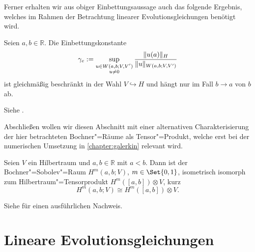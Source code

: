 \documentclass[../main.tex]{subfiles}
\begin{document}
Ferner erhalten wir aus obiger Einbettungsaussage auch das folgende Ergebnis, welches im Rahmen der Betrachtung linearer Evolutionsgleichungen benötigt wird.

\begin{Korollar}
\label{korollar:einbettungskonstante_M_e}
    Seien $a, b \in \mathbb{R}$.
    Die Einbettungskonstante
    \begin{equation}
        \label{eq:einbettungskonstante_M_e}
        \gamma_{e} := \sup_{\substack{u\in W(a, b; V, V')\\u \neq 0}} \frac{\lVert u(a)\rVert_{H}}{\lVert u\rVert_{W(a, b; V, V')}}
    \end{equation}
    ist gleichmäßig beschränkt in der Wahl $V \hookrightarrow H$ und hängt nur im Fall $b \to a$ von $b$ ab.

    \begin{Beweis}
        Siehe \cites[Section 5]{Schwab:2009ec}[Beweis zu Theorem XVIII.2.1]{Dautray:1992by}.
    \end{Beweis}
\end{Korollar}
%

Abschließen wollen wir diesen Abschnitt mit einer alternativen Charakterisierung der hier betrachteten Bochner"=Räume als Tensor"=Produkt, welche erst bei der numerischen Umsetzung in \cref{chapter:galerkin} relevant wird.

\begin{Satz}
\label{satz:bochner_sobolev_raum_als_tensorprodukt}
    Seien $V$ ein Hilbertraum und $a, b \in \mathbb{R}$ mit $a < b$.
    Dann ist der Bochner"=Sobolev"=Raum $H^{m}(a, b; V)$, $m \in \Set{0, 1}$, isometrisch isomorph zum Hilbertraum"=Tensorprodukt $H^{m}([a, b]) \otimes V$, kurz
    \begin{equation}
        H^{m}(a, b; V) \cong H^{m}([a, b]) \otimes V.
    \end{equation}

    \begin{Beweis}
        Siehe \cite[Theorem 12.6.1, Theorem 12.7.1]{Aubin:2000un} für einen ausführlichen Nachweis.
    \end{Beweis}
\end{Satz}


\section{Lineare Evolutionsgleichungen} %
\label{section:lineare_evolutionsgleichungen}
\end{document}
